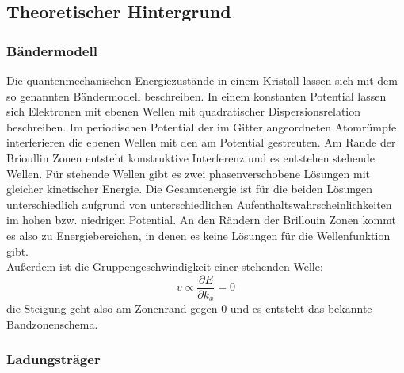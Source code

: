
\subsection{Theoretischer Hintergrund}
\subsubsection{Bändermodell}
Die quantenmechanischen Energiezustände in einem Kristall lassen sich mit dem so genannten Bändermodell beschreiben.
In einem konstanten Potential lassen sich Elektronen mit ebenen Wellen mit quadratischer Dispersionsrelation beschreiben. 
Im periodischen Potential der im Gitter angeordneten Atomrümpfe interferieren die ebenen Wellen mit den am Potential gestreuten.
Am Rande der Brioullin Zonen entsteht konstruktive Interferenz und es entstehen stehende Wellen. Für stehende Wellen gibt es zwei phasenverschobene Lösungen mit gleicher kinetischer Energie. Die Gesamtenergie ist für die beiden Lösungen unterschiedlich aufgrund von unterschiedlichen Aufenthaltswahrscheinlichkeiten im hohen bzw. niedrigen Potential.
An den Rändern der Brillouin Zonen kommt es also zu Energiebereichen, in denen es keine Lösungen für die Wellenfunktion gibt.\\
Außerdem ist die Gruppengeschwindigkeit einer stehenden Welle:
$$v \propto \frac{\partial E}{\partial k_x} = 0$$
die Steigung geht also am Zonenrand gegen $0$ und es entsteht das bekannte Bandzonenschema.


\subsubsection{Ladungsträger}

